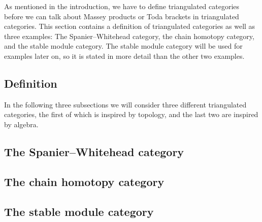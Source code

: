 As mentioned in the introduction, we have to define triangulated categories before we can talk about Massey products or Toda brackets in triangulated categories. This section contains a definition of triangulated categories as well as three examples: The Spanier--Whitehead category, the chain homotopy category, and the stable module category. The stable module category will be used for examples later on, so it is stated in more detail than the other two examples.

\subsection{Definition}


In the following three subsections we will consider three different triangulated categories, the first of which is inspired by topology, and the last two are inspired by algebra.
\subsection{The Spanier--Whitehead category}
\label{subsubsection:spanier_whitehead_cat}


\subsection{The chain homotopy category}
\label{subsubsection:chain_homotopy_cat}


\subsection{The stable module category}
\label{subsubsection:stable_module_cat}
